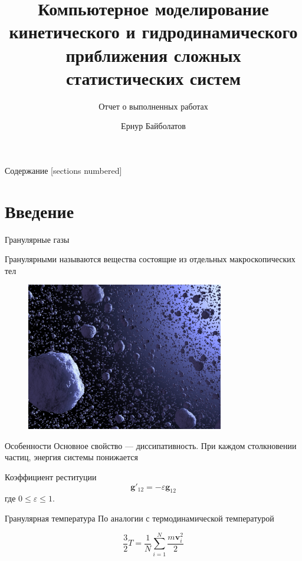 \documentclass[10pt]{beamer}
\title{Компьютерное моделирование кинетического и
гидродинамического приближения сложных статистических систем}
\subtitle{Отчет о выполненных работах}
\date{}
\author{Ернур Байболатов}
\institute{STEM парк, КазНПУ им. Абая}
\newcommand{\bv}{\bm{v}}
\newcommand{\bg}{\bm{g}}
\begin{document}
\maketitle

\begin{frame}{Содержание}
  [sections numbered]
  \tableofcontents[hideallsubsections]
\end{frame}

\section{Введение}

\begin{frame}[fragile]{Гранулярные газы}

  Гранулярными называются вещества состоящие из отдельных макроскопических тел

  \begin{figure}[h]
    \centering
    \includegraphics[width=0.77\textwidth]{gran_gas.jpg}    
    \label{fig:granular_gas}
  \end{figure}

\end{frame}

\begin{frame}[fragile]{Особенности}
  Основное свойство --- диссипативность. При каждом столкновении частиц, энергия системы понижается

  Коэффициент реституции
  \begin{equation}
    \bg'_{12} = -\varepsilon\bg_{12}
  \end{equation}
  где $0\leq\varepsilon\leq 1$.  
  
\end{frame}

\begin{frame}[fragile]{Гранулярная температура}
  По аналогии с термодинамической температурой

  \begin{equation}
    \frac{3}{2}T = \frac{1}{N}\sum_{i=1}^{N}\frac{m\bv_i^2}{2}
  \end{equation}
  
\end{frame}
\end{document}

